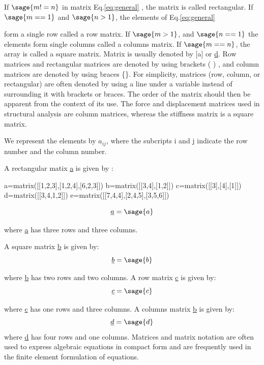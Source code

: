 \documentclass[12pt]{report}
\newcommand{\eref}[1]{
	Eq.\ref{#1}
}
\begin{document}
If $\sage{m!=n}$ in matrix \eref{eq:general},
the matrix is called rectangular. If $\sage{m==1}$ 
and $\sage{n>1}$, the elements of \eref{eq:general}
form a single row called a row matrix. If $\sage{m>1}$,
and $\sage{n==1}$ the elements form single columns called
a columns matrix. If $\sage{m==n}$, the array is called
a square matrix. Matrix is usually denoted by
[a] or \underline{d}. Row matrices and rectangular 
matrices are denoted by using brackets ( ) , and 
column matrices are denoted by using 
braces \{\}. For simplicity, matrices (row, column,
or rectangular) are often denoted by using a line 
under a variable instead of surrounding it with 
brackets or braces. The order of the matrix should 
then be apparent from the context of its 
use. The force and displacement matrices used in 
structural analysis are column matrices, whereas 
the stiffness matrix is a square matrix.

We represent the elements by $a_{{ij}}$,
where the subcripts i and j indicate the
row number and the column number.

A rectangular matix \underline{a} is given by : 
\begin{sagesilent}
	a=matrix([[1,2,3],[1,2,4],[6,2,3]])
	b=matrix([[3,4],[1,2]])
	c=matrix([[3],[4],[1]])
	d=matrix([[3,4,1,2]])
	e=matrix([[7,4,4],[2,4,5],[3,5,6]])
\end{sagesilent}
\begin{equation}
	\underline{a}=\sage{a}
\label{eq:rectangle}
\end{equation}

where \underline{a} has three rows and three columns.

A square matrix \underline{b} is given by:
\begin{equation}
	\underline{b}=\sage{b}
\label{eq:square}
\end{equation}

where \underline{b} has two rows and two
columns. A row matrix \underline{c} is given by:
\begin{equation}
	\underline{c}=\sage{c}
\label{eq:row}
\end{equation}

where \underline{c} has one rows and three
columns. A columns matrix \underline{b} is given by:
\begin{equation}
	\underline{d}=\sage{d}
\label{eq:col}
\end{equation}
where \underline{d} has four rows and one 
columns. Matrices and matrix notation are
often used to express algebraic equations 
in compact form and are frequently used 
in the finite element formulation of equations.
\end{document}
